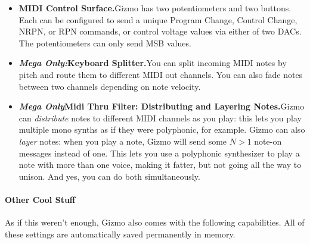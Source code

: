 \documentclass{article}
\begin{document}
\begin{itemize}
\item {\bf MIDI Control Surface.}\quad Gizmo has two potentiometers and two buttons.  Each can be configured to send a unique Program Change, Control Change, NRPN, or RPN commands, or control voltage values via either of two DACs.  The potentiometers can only send MSB values.

\item {\bf \textit{Mega Only:}\quad Keyboard Splitter.}\quad You can split incoming MIDI notes by pitch and route them to different MIDI out channels.  You can also fade notes between two channels depending on note velocity.

\item {\bf \textit{Mega Only}\quad Midi Thru Filter: Distributing and Layering Notes.}\quad Gizmo can {\it distribute} notes to different MIDI channels as you play: this lets you play multiple mono synths as if they were polyphonic, for example.  Gizmo can also {\it layer} notes: when you play a note, Gizmo will send some \(N>1\) note-on messages instead of one.  This lets you use a polyphonic synthesizer to play a note with more than one voice, making it fatter, but not going all the way to unison.  And yes, you can do both simultaneously.

\end{itemize}

\paragraph{Other Cool Stuff}

As if this weren't enough, Gizmo also comes with the following capabilities.  All of these settings are automatically saved permanently in memory.
\end{document}
